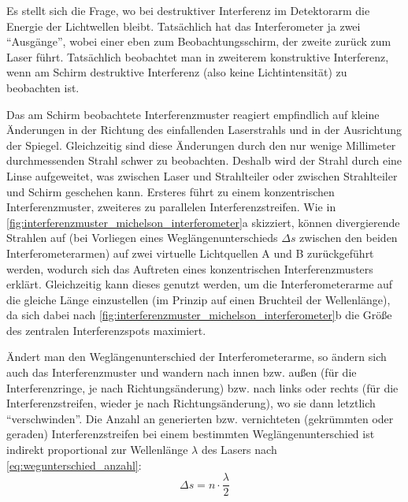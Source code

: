 \documentclass[ngerman]{scrartcl}
\begin{document}
Es stellt sich die Frage, wo bei destruktiver Interferenz im Detektorarm die Energie der Lichtwellen bleibt. Tatsächlich hat das Interferometer ja zwei \enquote{Ausgänge}, wobei einer eben zum Beobachtungsschirm, der zweite zurück zum Laser führt. Tatsächlich beobachtet man in zweiterem konstruktive Interferenz, wenn am Schirm destruktive Interferenz (also keine Lichtintensität) zu beobachten ist.

Das am Schirm beobachtete Interferenzmuster reagiert empfindlich auf kleine Änderungen in der Richtung des einfallenden Laserstrahls und in der Ausrichtung der Spiegel. Gleichzeitig sind diese Änderungen durch den nur wenige Millimeter durchmessenden Strahl schwer zu beobachten. Deshalb wird der Strahl durch eine Linse aufgeweitet, was zwischen Laser und Strahlteiler oder zwischen Strahlteiler und Schirm geschehen kann. Ersteres führt zu einem konzentrischen Interferenzmuster, zweiteres zu parallelen Interferenzstreifen. Wie in \autoref{fig:interferenzmuster_michelson_interferometer}a skizziert, können divergierende Strahlen auf (bei Vorliegen eines Weglängenunterschieds $\Delta s$ zwischen den beiden Interferometerarmen) auf zwei virtuelle Lichtquellen A und B zurückgeführt werden, wodurch sich das Auftreten eines konzentrischen Interferenzmusters erklärt. Gleichzeitig kann dieses genutzt werden, um die Interferometerarme auf die gleiche Länge einzustellen (im Prinzip auf einen Bruchteil der Wellenlänge), da sich dabei nach \autoref{fig:interferenzmuster_michelson_interferometer}b die Größe des zentralen Interferenzspots maximiert.

Ändert man den Weglängenunterschied der Interferometerarme, so ändern sich auch das Interferenzmuster und wandern nach innen bzw. außen (für die Interferenzringe, je nach Richtungsänderung) bzw. nach links oder rechts (für die Interferenzstreifen, wieder je nach Richtungsänderung), wo sie dann letztlich \enquote{verschwinden}. Die Anzahl an generierten bzw. vernichteten (gekrümmten oder geraden) Interferenzstreifen bei einem bestimmten Weglängenunterschied ist indirekt proportional zur Wellenlänge $\lambda$ des Lasers nach \autoref{eq:wegunterschied_anzahl}:
\begin{equation}
    \label{eq:wegunterschied_anzahl}
    \Delta s = n \cdot \frac{\lambda}{2}
\end{equation}
\end{document}
